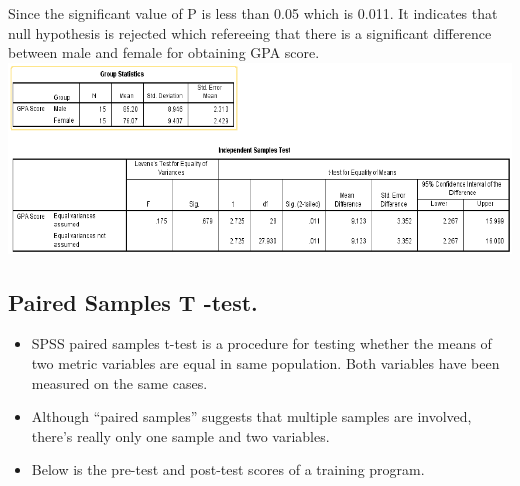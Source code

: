 \documentclass[
  letterpaper,
  DIV=11,
  numbers=noendperiod]{scrreprt}
\providecommand{\tightlist}{%
  \setlength{\itemsep}{0pt}\setlength{\parskip}{0pt}}\usepackage{longtable,booktabs,array}
\begin{document}
\begin{tcolorbox}[enhanced jigsaw, rightrule=.15mm, arc=.35mm, colframe=quarto-callout-note-color-frame, coltitle=black, left=2mm, colbacktitle=quarto-callout-note-color!10!white, bottomtitle=1mm, titlerule=0mm, colback=white, breakable, opacitybacktitle=0.6, opacityback=0, toprule=.15mm, toptitle=1mm, title=\textcolor{quarto-callout-note-color}{\faInfo}\hspace{0.5em}{Decision}, bottomrule=.15mm, leftrule=.75mm]

Since the significant value of P is less than 0.05 which is 0.011. It
indicates that null hypothesis is rejected which refereeing that there
is a significant difference between male and female for obtaining GPA
score.\\

\includegraphics{images/ind-t-test-out1.png}

\end{tcolorbox}

\subsection{Paired Samples T -test.}\label{paired-samples-t--test.}

\begin{itemize}
\tightlist
\item
  SPSS paired samples t-test is a procedure for testing whether the
  means of two metric variables are equal in same population. Both
  variables have been measured on the same cases.\\
\item
  Although ``paired samples'' suggests that multiple samples are
  involved, there's really only one sample and two variables.\\
\item
  Below is the pre-test and post-test scores of a training program.\\
\end{itemize}
\end{document}
